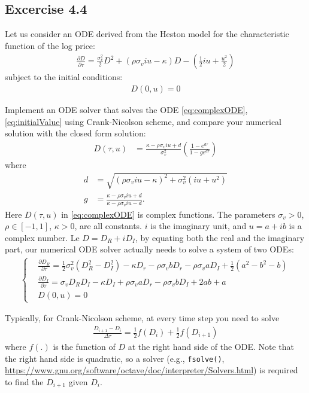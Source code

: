 \documentclass[10pt,a4paper,hidelinks,fleqn]{article}            %
\newcommand{\pder}[2]{\frac{\partial#1}{\partial#2}}
\begin{document}
\subsection*{Excercise 4.4}
Let us consider an ODE derived from the Heston model for the characteristic function \cite{heston93} of the log price:
\begin{align}
\pder{D}{\tau} = \frac{\sigma_v^2}{2} D^2 + (\rho\sigma_viu - \kappa)D - (\frac12 iu + \frac{u^2}{2})
\label{eq:complexODE}
\end{align}
subject to the initial conditions:
\begin{align}
D(0, u) = 0
\label{eq:initialValue}
\end{align}

Implement an ODE solver that solves the ODE \eqref{eq:complexODE}, \eqref{eq:initialValue} using Crank-Nicolson scheme,
and compare your numerical solution with the closed form solution:
\begin{align}
D(\tau, u) & = \frac{\kappa - \rho \sigma_v iu + d}{\sigma_v^2} \left( \frac{1-e^{d\tau}}{1-ge^{d\tau}} \right)
\label{eq:closedFormD}
\end{align}
where
\begin{align}
d & = \sqrt{(\rho \sigma_v iu - \kappa)^2 + \sigma_v^2 (iu+u^2)} \\
g & = \frac{\kappa - \rho \sigma_v iu + d}{\kappa - \rho \sigma_v iu - d}.
\end{align}
Here $D(\tau, u)$ in \eqref{eq:complexODE} is complex functions.
The parameters $\sigma_v > 0$, $\rho \in [-1, 1]$, $\kappa > 0$, are all constants. 
$i$ is the imaginary unit, and $u=a+ib$ is a complex number.
Le $D = D_R + iD_I$, by equating both the real and the imaginary part, 
our numerical ODE solver actually needs to solve a system of two ODEs:
\begin{align}
\begin{cases}
& \pder{D_R}{\tau} = \frac{1}{2}\sigma_v^2 (D_R^2 - D_I^2) - \kappa D_r  - \rho \sigma_v b D_r - \rho \sigma_v a D_I  + \frac{1}{2}(a^2 - b^2 - b) \\
& \pder{D_I}{\tau} = \sigma_v D_R D_I - \kappa D_I + \rho \sigma_v a D_r - \rho \sigma_v b D_I + 2ab + a \\ 
& D(0, u) = 0
\end{cases}
\end{align}

Typically, for Crank-Nicolson scheme, at every time step you need to solve 
\begin{align*}
\frac{D_{i+1} - D_i}{\Delta \tau} = \frac{1}{2}f(D_i) + \frac{1}{2}f(D_{i+1})
\end{align*}
where $f(.)$ is the function of $D$ at the right hand side of the ODE.
Note that the right hand side is quadratic, 
so a solver (e.g., \verb=fsolve()=, \url{https://www.gnu.org/software/octave/doc/interpreter/Solvers.html}) is required to find the $D_{i+1}$ given $D_i$.
\end{document}
